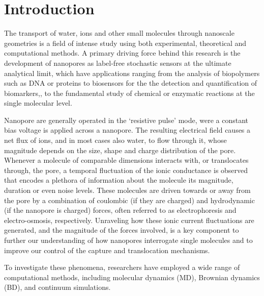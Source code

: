\documentclass[journal=ancac3,manuscript=article,etalmode=truncate,maxauthors=0,layout=twocolumn]{achemso}
\begin{document}
\section{Introduction}

The transport of water, ions and other small molecules through nanoscale geometries is a field of intense
study using both experimental, theoretical and computational methods.\cite{Sparreboom-2010,Bocquet-2010,
Maffeo-2012,Thomas-2014,Wang-2014,Kim-2015} A primary driving force behind this research is the development
of nanopores as label-free stochastic sensors at the ultimate analytical limit,\cite{Bayley-2001,Dekker-2007,
Venkatesan-2011,Zhang-2016} which have applications ranging from the analysis of biopolymers such as
DNA\cite{Deamer-2016} or proteins\cite{Restrepo-Perez-2018} to biosensors for the the detection and
quantification of biomarkers,\cite{Soskine-2012,VanMeervelt-2014,Huang-2017,Chen-2013}, to the fundamental
study of chemical or enzymatic reactions at the single molecular level.\cite{Willems-VanMeervelt-2017,
Laszlo-2017}

Nanopore are generally operated in the `resistive pulse' mode, were a constant bias voltage is applied across
a nanopore. The resulting electrical field causes a net flux of ions, and in most cases also water, to flow
through it, whose magnitude depends on the size, shape and charge distribution of the pore. Whenever a
molecule of comparable dimensions interacts with, or translocates through, the pore, a temporal fluctuation
of the ionic conductance is observed that encodes a plethora of information about the molecule its magnitude,
duration or even noise levels. These molecules are driven towards or away from the pore by a combination of
coulombic (if they are charged) and hydrodynamic (if the nanopore is charged) forces, often referred to as
electrophoresis and electro-osmosis, respectively. Unraveling how these ionic current fluctuations are
generated, and the magnitude of the forces involved, is a key component to further our understanding of how
nanopores interrogate single molecules and to improve our control of the capture and translocation mechanisms.

To investigate these phenomena, researchers have employed a wide range of computational methods, including
molecular dynamics (MD), Brownian dynamics (BD), and continuum simulations.

\end{document}
